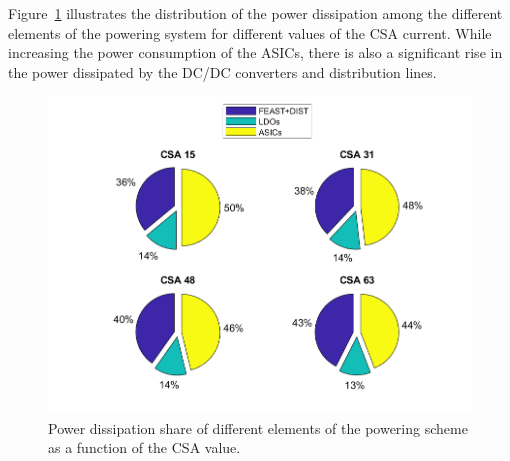 Figure~\ref{fig_power_CSA} illustrates the distribution of the power dissipation among the different elements of the powering system for different values of the \gls{CSA} current. While increasing the power consumption of the \glspl{ASIC}, there is also a  significant rise in the power dissipated by the DC/DC converters and distribution lines. %

\begin{figure}[h!]
\centering
\includegraphics[width=0.6\columnwidth]{Chapter6/DCS/images/pie.png}
\caption{Power dissipation share of different elements of the powering scheme as a function of the \gls{CSA} value.}
\label{fig_power_CSA}
\end{figure}

